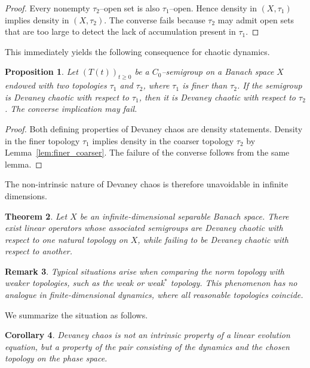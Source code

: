 \documentclass[12pt]{article}
\newtheorem{theorem}{Theorem}[section]
\newtheorem{proposition}[theorem]{Proposition}
\newtheorem{remark}[theorem]{Remark}
\newtheorem{corollary}[theorem]{Corollary}
\begin{document}
\begin{proof}
Every nonempty $\tau_2$--open set is also $\tau_1$--open. Hence density in $(X,\tau_1)$ implies density in $(X,\tau_2)$. The converse fails because $\tau_2$ may admit open sets that are too large to detect the lack of accumulation present in $\tau_1$.
\end{proof}

This immediately yields the following consequence for chaotic dynamics.

\begin{proposition}\label{prop:devaney_topology}
Let $(T(t))_{t\ge0}$ be a $C_0$--semigroup on a Banach space $X$ endowed with two topologies $\tau_1$ and $\tau_2$, where $\tau_1$ is finer than $\tau_2$. If the semigroup is Devaney chaotic with respect to $\tau_1$, then it is Devaney chaotic with respect to $\tau_2$. The converse implication may fail.
\end{proposition}

\begin{proof}
Both defining properties of Devaney chaos are density statements. Density in the finer topology $\tau_1$ implies density in the coarser topology $\tau_2$ by Lemma~\ref{lem:finer_coarser}. The failure of the converse follows from the same lemma.
\end{proof}

The non-intrinsic nature of Devaney chaos is therefore unavoidable in infinite dimensions.

\begin{theorem} {\cite{BayartMatheron2009}}
\label{thm:topology_sensitive}
Let $X$ be an infinite-dimensional separable Banach space. There exist linear operators whose associated semigroups are Devaney chaotic with respect to one natural topology on $X$, while failing to be Devaney chaotic with respect to another.
\end{theorem}

\begin{remark}
Typical situations arise when comparing the norm topology with weaker topologies, such as the weak or weak$^\ast$ topology. This phenomenon has no analogue in finite-dimensional dynamics, where all reasonable topologies coincide.
\end{remark}

We summarize the situation as follows.

\begin{corollary}\label{cor:not_intrinsic}
Devaney chaos is not an intrinsic property of a linear evolution equation, but a property of the pair consisting of the dynamics and the chosen topology on the phase space.
\end{corollary}
\end{document}

